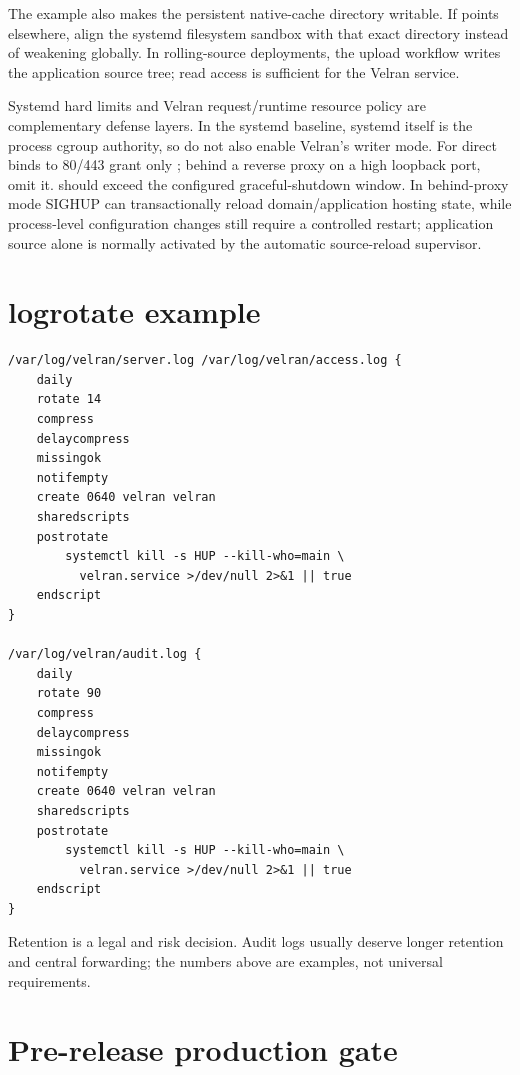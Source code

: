 The example also makes the persistent native-cache directory writable. If  points elsewhere, align the systemd filesystem sandbox with that exact directory instead of weakening  globally. In rolling-source deployments, the upload workflow writes the application source tree; read access is sufficient for the Velran service.\par\medskip

Systemd hard limits and Velran request/runtime resource policy are complementary defense layers. In the systemd baseline, systemd itself is the process cgroup authority, so do not also enable Velran's \code{[cgroup]} writer mode. For direct binds to 80/443 grant only ; behind a reverse proxy on a high loopback port, omit it.  should exceed the configured graceful-shutdown window. In behind-proxy mode SIGHUP can transactionally reload domain/application hosting state, while process-level configuration changes still require a controlled restart; application source alone is normally activated by the automatic source-reload supervisor.

\section{logrotate example}

\begin{lstlisting}
/var/log/velran/server.log /var/log/velran/access.log {
    daily
    rotate 14
    compress
    delaycompress
    missingok
    notifempty
    create 0640 velran velran
    sharedscripts
    postrotate
        systemctl kill -s HUP --kill-who=main \
          velran.service >/dev/null 2>&1 || true
    endscript
}

/var/log/velran/audit.log {
    daily
    rotate 90
    compress
    delaycompress
    missingok
    notifempty
    create 0640 velran velran
    sharedscripts
    postrotate
        systemctl kill -s HUP --kill-who=main \
          velran.service >/dev/null 2>&1 || true
    endscript
}
\end{lstlisting}

Retention is a legal and risk decision. Audit logs usually deserve longer retention and central forwarding; the numbers above are examples, not universal requirements.

\section{Pre-release production gate}

